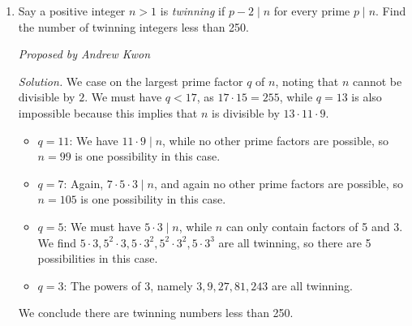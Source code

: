 \documentclass[10pt]{article}
\newcommand{\proposed}[1]
{
\vspace{5pt}
\noindent\textit{Proposed by #1}
}
\newcommand{\solution}
{
\vspace{5pt}
\noindent\textit{Solution.}\qquad
}
\begin{document}
\begin{enumerate}
\solution Suppose that Rick has a winning strategy for some value of $n$ and let $S_i$ denote the sum of the numbers on the board modulo $100$ after round $i$. At the end of the $n^\text{th}$ round, the sum of all the numbers written on the board must be $0\pmod{100}$. Now, consider the state of the game at the end of the $(n-1)^\text{th}$ round. We claim that $S_{n?1} \equiv 2\pmod{100}$ in order for Rick to be guaranteed to achieve $S_n?0 \pmod{100}$. If $S_{n?1}\equiv 2 \pmod{100}$, then no matter what value $k$ Pat chooses, Rick can write $98?k$ and win the game. On the other hand, if $S_{n?1}\equiv \ell \pmod{100}$ where $\ell \neq 2$ then Pat can choose
\[
k = \begin{cases}
1 & \text{if } \ell = 0,1\\
100 - \ell & \text{otherwise,}
\end{cases}
\]
and in these cases Rick cannot guarantee a win. Proceeding inductively, we find that $S_{n-i} \equiv 2 i \pmod{100}$ is necessary in order for Rick to win. Evidently $S_0 \equiv 0 \pmod{100}$, and so $S_0 \equiv 2n \equiv 0 \pmod{100}$. The minimal $n$ satisfying this is $n=\boxed{50}$.

\item Say a positive integer $n > 1$ is \textit{twinning} if $p - 2 \mid n$ for every prime $p \mid n$. Find the number of twinning integers less than 250.

\proposed{Andrew Kwon}

\solution We case on the largest prime factor $q$ of $n$, noting that $n$ cannot be divisible by $2$. We must have $q < 17$, as $17 \cdot 15 = 255$, while $q = 13$ is also impossible because this implies that $n$ is divisible by $13 \cdot 11 \cdot 9$. 
\begin{itemize}
\item $q = 11$: We have $11 \cdot 9 \mid n$, while no other prime factors are possible, so $n=99$ is one possibility in this case.
\item $q = 7$: Again, $7 \cdot 5 \cdot 3 \mid n$, and again no other prime factors are possible, so $n = 105$ is one possibility in this case.
\item $q = 5$: We must have $5 \cdot 3 \mid n$, while $n$ can only contain factors of 5 and 3. We find $5 \cdot 3, 5^{2} \cdot 3, 5 \cdot 3^{2}, 5^{2} \cdot 3^{2}, 5 \cdot 3^{3}$ are all twinning, so there are 5 possibilities in this case.
\item $q = 3$: The powers of 3, namely $3, 9, 27, 81, 243$ are all twinning.
\end{itemize}
We conclude there are  twinning numbers less than 250. 


\end{enumerate}
\end{document}
